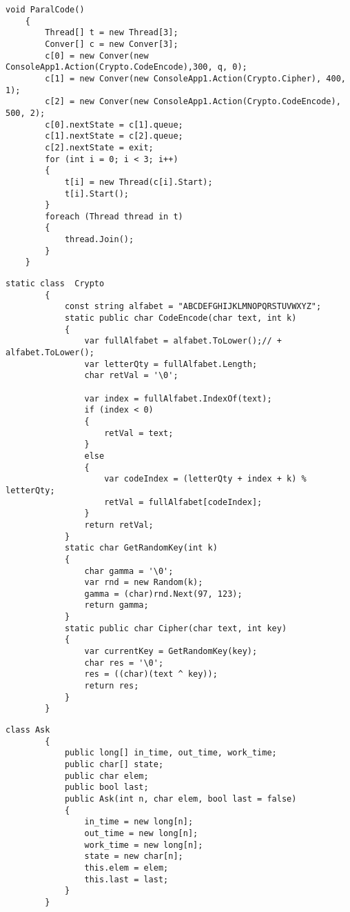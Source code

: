 \begin{center}
\begin{lstlisting}[label=l3,caption = {Реализация параллельной обработки данных}]
	void ParalCode()
	{
		Thread[] t = new Thread[3];
		Conver[] c = new Conver[3];
		c[0] = new Conver(new ConsoleApp1.Action(Crypto.CodeEncode),300, q, 0);
		c[1] = new Conver(new ConsoleApp1.Action(Crypto.Cipher), 400, 1);
		c[2] = new Conver(new ConsoleApp1.Action(Crypto.CodeEncode), 500, 2);
		c[0].nextState = c[1].queue;
		c[1].nextState = c[2].queue;
		c[2].nextState = exit;
		for (int i = 0; i < 3; i++)
		{
			t[i] = new Thread(c[i].Start);
			t[i].Start();
		}
		foreach (Thread thread in t)
		{
			thread.Join();
		}
	}
\end{lstlisting}
\end{center}
\begin{center}
	\begin{lstlisting}[label=l4,caption = {Реализация алгоритмов шифрования}]
		 static class  Crypto
		{
			const string alfabet = "ABCDEFGHIJKLMNOPQRSTUVWXYZ";
			static public char CodeEncode(char text, int k)
			{
				var fullAlfabet = alfabet.ToLower();// + alfabet.ToLower();
				var letterQty = fullAlfabet.Length;
				char retVal = '\0';
				
				var index = fullAlfabet.IndexOf(text);
				if (index < 0)
				{
					retVal = text;
				}
				else
				{
					var codeIndex = (letterQty + index + k) % letterQty;
					retVal = fullAlfabet[codeIndex];
				}
				return retVal;
			}
			static char GetRandomKey(int k)
			{
				char gamma = '\0';
				var rnd = new Random(k);
				gamma = (char)rnd.Next(97, 123);
				return gamma;
			}
			static public char Cipher(char text, int key)
			{
				var currentKey = GetRandomKey(key);
				char res = '\0';
				res = ((char)(text ^ key));
				return res;
			}
		}
	\end{lstlisting}
\end{center}
\begin{center}
	\begin{lstlisting}[label=l5,caption = {Реализация структуры заявки}]
		class Ask
		{
			public long[] in_time, out_time, work_time;
			public char[] state;
			public char elem;
			public bool last;
			public Ask(int n, char elem, bool last = false)
			{
				in_time = new long[n];
				out_time = new long[n];
				work_time = new long[n];
				state = new char[n];
				this.elem = elem;
				this.last = last;
			}
		}
	\end{lstlisting}
\end{center}


